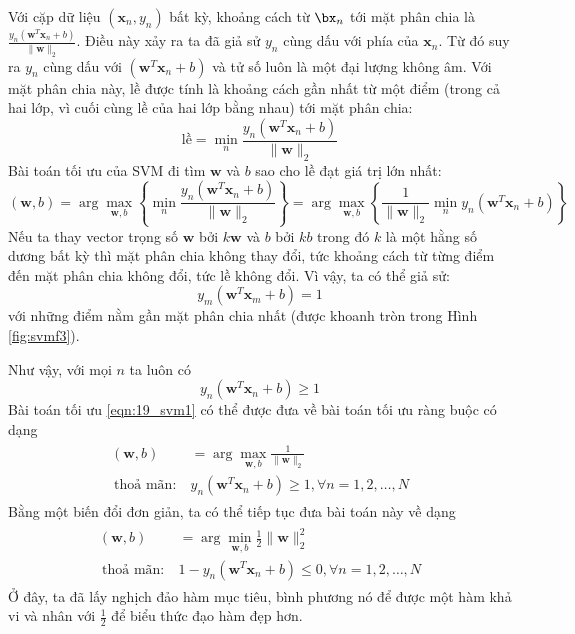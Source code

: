 Với cặp dữ liệu 
$(\mathbf{x}_n, y_n)$ bất kỳ, khoảng cách từ $\bx_n$ tới mặt phân chia là
\begin{math} 
\frac{y_n(\mathbf{w}^T\mathbf{x}_n + b)}{\|\mathbf{w}\|_2} 
\end{math}. 
Điều này xảy ra ta đã giả sử $y_n$ cùng dấu với {phía} của $\mathbf{x}_n$. Từ đó suy ra $y_n$ cùng dấu với
$(\mathbf{w}^T\mathbf{x}_n + b)$ và tử số luôn là một đại lượng không âm.
Với mặt phân chia này, lề được tính là khoảng cách gần nhất từ một
điểm (trong cả hai lớp, vì cuối cùng lề của hai lớp bằng nhau)
tới mặt phân chia:
\begin{equation*} 
\text{lề} = \min_{n} \frac{y_n(\mathbf{w}^T\mathbf{x}_n + b)}{\|\mathbf{w}\|_2} 
\end{equation*} 
Bài toán tối ưu của SVM đi tìm $\mathbf{w}$ và $b$ sao cho lề đạt giá trị lớn nhất: 
\begin{equation} 
\label{eqn:19_svm1}
(\mathbf{w}, b) = \arg\max_{\mathbf{w}, b} \left\{ 
    \min_{n} \frac{y_n(\mathbf{w}^T\mathbf{x}_n + b)}{\|\mathbf{w}\|_2}  
\right\} 
= \arg\max_{\mathbf{w}, b}\left\{ 
    \frac{1}{\|\mathbf{w}\|_2} \min_{n} y_n(\mathbf{w}^T\mathbf{x}_n + b) 
\right\}
\end{equation} 
Nếu ta thay vector trọng số $\mathbf{w}$ bởi
$k\mathbf{w}$ và $b$ bởi $kb$ trong đó $k$ là một hằng số dương {bất kỳ}
thì mặt phân chia không thay đổi, tức khoảng cách từ từng điểm đến mặt phân chia
không đổi, tức lề không đổi. Vì vậy, ta có thể giả
sử:
\begin{equation*} 
y_m(\mathbf{w}^T\mathbf{x}_m + b) = 1 %
\end{equation*} 
{với những điểm nằm gần mặt phân chia nhất} (được khoanh tròn trong Hình \ref{fig:svmf3}).

Như vậy, với mọi $n$ ta luôn có 
\begin{equation*} 
y_n(\mathbf{w}^T\mathbf{x}_n + b) \geq 1 
\end{equation*} 
Bài toán tối ưu \eqref{eqn:19_svm1} có thể được đưa về bài toán tối ưu ràng buộc có dạng 
\begin{eqnarray} 
\begin{aligned}
    (\mathbf{w}, b) &= \arg \max_{\mathbf{w}, b} \frac{1}{\|\mathbf{w}\|_2}   \\\ 
    \text{thoả mãn:}~ & y_n(\mathbf{w}^T\mathbf{x}_n + b) \geq 1, \forall n = 1, 2, \dots, N 
\end{aligned}
\end{eqnarray} 
Bằng một biến đổi đơn giản, ta có thể tiếp tục đưa bài toán này về dạng 
\begin{eqnarray} 
    \label{eqn:19_svm3}
\begin{aligned}
    (\mathbf{w}, b) &= \arg \min_{\mathbf{w}, b} \frac{1}{2}\|\mathbf{w}\|_2^2   \\\ 
    \text{thoả mãn:}~ & 1 - y_n(\mathbf{w}^T\mathbf{x}_n + b) \leq 0, \forall n = 1, 2, \dots, N
\end{aligned}
\end{eqnarray} 
Ở đây, ta đã lấy nghịch đảo hàm mục tiêu, bình phương nó để được một hàm
khả vi và nhân với $\displaystyle\frac{1}{2}$ để biểu thức đạo hàm đẹp hơn. 
 
